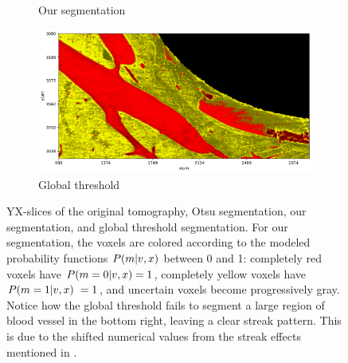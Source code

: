 \begin{figure}
\begin{subfigure}{0.5\textwidth}
      \caption{Our segmentation}
    \end{subfigure}%
    \begin{subfigure}{0.5\textwidth}
      \centering
      \includegraphics[width=\linewidth]{generated/770c_pag_global_yx.pdf}
      \caption{Global threshold}
    \end{subfigure}
  \caption{
	  YX-slices of the original tomography, Otsu segmentation, our
	  segmentation, and global threshold segmentation.  For our
	  segmentation, the voxels are colored according to the modeled
	  probability functions $P(m\vert v,x)$ between 0 and 1: completely
	  red voxels have $P(m=0\vert v,x) = 1$, completely yellow voxels
	  have $P(m=1\vert v,x)\ = 1$, and uncertain voxels become
	  progressively gray. Notice how the global threshold fails to segment
	  a large region of blood vessel in the bottom right, leaving a clear
	  streak pattern. This is due to the shifted numerical values from the
	  streak effects mentioned in .
    }
    \label{fig:histology-comparison1}
\end{figure}

